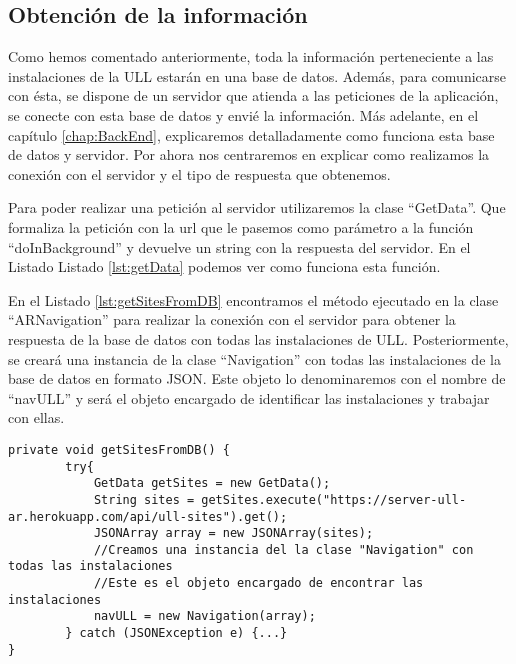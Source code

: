  

\subsection{Obtención de la información}

Como hemos comentado anteriormente, toda la información perteneciente a las instalaciones de la ULL estarán en una base de datos. Además, para comunicarse con ésta, se dispone de un servidor que atienda a las peticiones de la aplicación, se conecte con esta base de datos y  envié la información. Más adelante, en el capítulo \ref{chap:BackEnd}, explicaremos detalladamente como funciona esta base de datos y servidor. Por ahora nos centraremos en explicar como realizamos la conexión con el servidor y el tipo de respuesta que obtenemos.

Para poder realizar una petición al servidor utilizaremos la clase ``GetData''. Que formaliza la petición con la url que le pasemos como parámetro a la función ``doInBackground'' y devuelve un string con la respuesta del servidor. En el Listado Listado \ref{lst:getData} podemos ver como funciona esta función. 

 

En el Listado \ref{lst:getSitesFromDB} encontramos el método ejecutado en la clase ``ARNavigation'' para realizar la conexión con el servidor para obtener la respuesta de la base de datos con todas las instalaciones de ULL. Posteriormente, se creará una instancia de la clase ``Navigation'' con todas las instalaciones de la base de datos en formato JSON. Este objeto lo denominaremos con el nombre de ``navULL'' y será el objeto encargado de identificar las instalaciones y trabajar con ellas.

\bigskip
\bigskip
\bigskip
\bigskip

\begin{lstlisting}[caption={Método que conecta con el servidor y recibe la respuesta con todas las instalaciones de la base de datos.},  label={lst:getSitesFromDB}]
    private void getSitesFromDB() {
        try{
            GetData getSites = new GetData();
            String sites = getSites.execute("https://server-ull-ar.herokuapp.com/api/ull-sites").get();
            JSONArray array = new JSONArray(sites);
            //Creamos una instancia del la clase "Navigation" con todas las instalaciones
            //Este es el objeto encargado de encontrar las instalaciones
            navULL = new Navigation(array); 
        } catch (JSONException e) {...}
}
\end{lstlisting}

